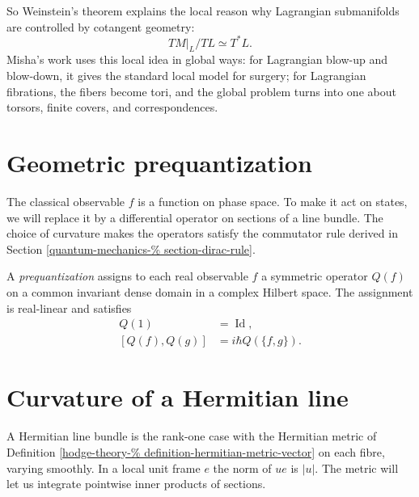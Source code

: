 \medskip\noindent
So Weinstein's theorem explains the local
reason why Lagrangian submanifolds are
controlled by cotangent geometry:
$$
TM|_L/TL\simeq T^*L.
$$
Misha's work uses this local idea in global
ways: for Lagrangian blow-up and blow-down,
it gives the standard local model for
surgery; for Lagrangian fibrations, the
fibers become tori, and the global problem
turns into one about torsors, finite covers,
and correspondences.

\section{Geometric prequantization}
\label{section-geometric-prequantization}

\begin{remark}
\label{section-overview-prequantization}
The classical observable $f$ is a function
on phase space. To make it act on states,
we will replace it by a differential
operator on sections of a line bundle. The
choice of curvature makes the operators
satisfy the commutator rule derived in
Section \ref{quantum-mechanics-%
section-dirac-rule}.
\end{remark}

\begin{definition}
\label{definition-dirac-prequantization}
A \emph{prequantization} assigns to each
real observable $f$ a symmetric operator
$Q(f)$ on a common invariant dense domain
in a complex Hilbert space. The assignment
is real-linear and satisfies
$$
\begin{aligned}
Q(1)&=\operatorname{Id},\\
[Q(f),Q(g)]&=i\hbar Q(\{f,g\}).
\end{aligned}
$$
\end{definition}

\section{Curvature of a Hermitian line}
\label{section-hermitian-line-bundles}

\begin{remark}
\label{definition-hermitian-line-bundle}
A Hermitian line bundle is the rank-one
case with the Hermitian metric of
Definition \ref{hodge-theory-%
definition-hermitian-metric-vector}
on each fibre, varying smoothly. In a
local unit frame $e$ the norm of $ue$ is
$|u|$. The metric will let us integrate
pointwise inner products of sections.
\end{remark}

